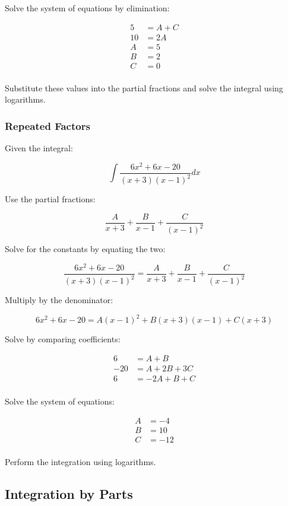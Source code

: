 \documentclass[a4paper,11pt]{report}
\begin{document}
Solve the system of equations by elimination:

$$
\begin{aligned}
5 & = A + C \\
10 & = 2A \\
A & = 5 \\
B & = 2 \\
C & = 0 \\
\end{aligned}
$$

Substitute these values into the partial fractions and solve the integral using
logarithms.

\subsubsection{Repeated Factors}

Given the integral:

$$
\int \frac{6x^2 + 6x - 20}{(x + 3)(x - 1)^2} dx
$$

Use the partial fractions:

$$
\frac{A}{x + 3} + \frac{B}{x - 1} + \frac{C}{(x - 1)^2}
$$

Solve for the constants by equating the two:

$$
\frac{6x^2 + 6x - 20}{(x + 3)(x - 1)^2} = \frac{A}{x + 3} + \frac{B}{x - 1} + \frac{C}{(x - 1)^2}
$$

Multiply by the denominator:

$$
6x^2 + 6x - 20 = A(x - 1)^2 + B(x + 3)(x - 1) + C(x + 3)
$$

Solve by comparing coefficients:

$$
\begin{aligned}
6 & = A + B \\
-20 & = A + 2B + 3C \\
6 & = -2A + B + C \\
\end{aligned}
$$

Solve the system of equations:

$$
\begin{aligned}
A & = -4 \\
B & = 10 \\
C & = -12 \\
\end{aligned}
$$

Perform the integration using logarithms.

\subsection{Integration by Parts}
\end{document}

